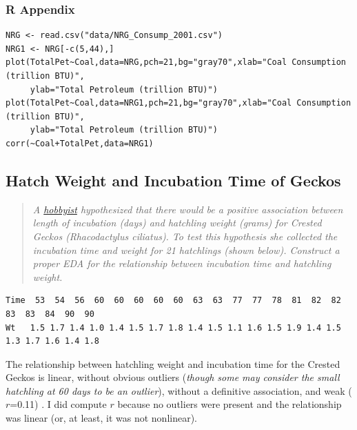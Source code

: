 \documentclass[10pt,openany]{book}\usepackage[]{graphicx}\usepackage[]{color}
\makeatletter
\newenvironment{kframe}{%
 \def\at@end@of@kframe{}%
 \ifinner\ifhmode%
  \def\at@end@of@kframe{\end{minipage}}%
  \begin{minipage}{\columnwidth}%
 \fi\fi%
 \def\FrameCommand##1{\hskip\@totalleftmargin \hskip-\fboxsep
 \colorbox{shadecolor}{##1}\hskip-\fboxsep
     \hskip-\linewidth \hskip-\@totalleftmargin \hskip\columnwidth}%
 \MakeFramed {\advance\hsize-\width
   \@totalleftmargin\z@ \linewidth\hsize
   \@setminipage}}%
 {\par\unskip\endMakeFramed%
 \at@end@of@kframe}
\newenvironment{knitrout}{}{} %
\makeatother
\begin{document}
\subsubsection*{R Appendix}
\begin{knitrout}
\color{fgcolor}\begin{kframe}
\begin{verbatim}
NRG <- read.csv("data/NRG_Consump_2001.csv")
NRG1 <- NRG[-c(5,44),]
plot(TotalPet~Coal,data=NRG,pch=21,bg="gray70",xlab="Coal Consumption (trillion BTU)",
     ylab="Total Petroleum (trillion BTU)")
plot(TotalPet~Coal,data=NRG1,pch=21,bg="gray70",xlab="Coal Consumption (trillion BTU)",
     ylab="Total Petroleum (trillion BTU)")
corr(~Coal+TotalPet,data=NRG1)
\end{verbatim}
\end{kframe}
\end{knitrout}

\newpage
\subsection*{Hatch Weight and Incubation Time of Geckos}
\begin{quote}
\textit{A \href{http://www.moonvalleyreptiles.com/breeding/incubation-length-and-hatch-weight}{hobbyist} hypothesized that there would be a positive association between length of incubation (days) and hatchling weight (grams) for Crested Geckos (Rhacodactylus ciliatus). To test this hypothesis she collected the incubation time and weight for 21 hatchlings (shown below). Construct a proper EDA for the relationship between incubation time and hatchling weight.}
\end{quote}

\begin{verbatim}
Time  53  54  56  60  60  60  60  60  63  63  77  77  78  81  82  82  83  83  84  90  90
Wt   1.5 1.7 1.4 1.0 1.4 1.5 1.7 1.8 1.4 1.5 1.1 1.6 1.5 1.9 1.4 1.5 1.3 1.7 1.6 1.4 1.8
\end{verbatim}



The relationship between hatchling weight and incubation time for the Crested Geckos is linear, without obvious outliers (\textit{though some may consider the small hatchling at 60 days to be an outlier}), without a definitive association, and weak ($r$=0.11) . I did compute $r$ because no outliers were present and the relationship was linear (or, at least, it was not nonlinear).
\end{document}

